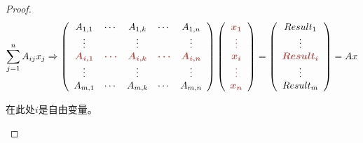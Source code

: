 \begin{proof}
    \begin{equation}\sum\limits _{j=1}^{n} A_{ij} x_{j} \Rightarrow 
    \left(\begin{array}{ c c c c c }
    A_{1,1} & \cdots  & A_{1,k} & \cdots  & A_{1,n}\\
    \vdots  &  & \vdots  &  & \vdots \\
    \boldsymbol{\textcolor[rgb]{0.72,0.33,0.31}{A}\textcolor[rgb]{0.72,0.33,0.31}{_{i,1}}} & \boldsymbol{\textcolor[rgb]{0.72,0.33,0.31}{\cdots }} & \boldsymbol{\textcolor[rgb]{0.72,0.33,0.31}{A}\textcolor[rgb]{0.72,0.33,0.31}{_{i,k}}} & \boldsymbol{\textcolor[rgb]{0.72,0.33,0.31}{\cdots }} & \boldsymbol{\textcolor[rgb]{0.72,0.33,0.31}{A}\textcolor[rgb]{0.72,0.33,0.31}{_{i,n}}}\\
    \vdots  &  & \vdots  &  & \vdots \\
    A_{m,1} & \cdots  & A_{m,k} & \cdots  & A_{m,n}
    \end{array}\right)\left(\begin{array}{ c }
    \boldsymbol{\textcolor[rgb]{0.72,0.33,0.31}{x}\textcolor[rgb]{0.72,0.33,0.31}{_{1}}}\\
    \boldsymbol{\textcolor[rgb]{0.72,0.33,0.31}{\vdots }}\\
    \boldsymbol{\textcolor[rgb]{0.72,0.33,0.31}{x}\textcolor[rgb]{0.72,0.33,0.31}{_{i}}}\\
    \boldsymbol{\textcolor[rgb]{0.72,0.33,0.31}{\vdots }}\\
    \boldsymbol{\textcolor[rgb]{0.72,0.33,0.31}{x}\textcolor[rgb]{0.72,0.33,0.31}{_{n}}}
    \end{array}\right) =\left(\begin{array}{ c }
    Result_{1}\\
    \vdots \\
    \boldsymbol{\textcolor[rgb]{0.72,0.33,0.31}{Result}\textcolor[rgb]{0.72,0.33,0.31}{_{i}}}\\
    \vdots \\
    Result_{m}
    \end{array}\right) =Ax\end{equation}

    \begin{remark}
        在此处$i$是自由变量。
    \end{remark}


\end{proof}
